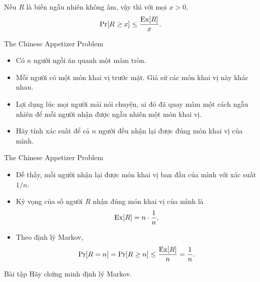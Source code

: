 \begin{frame}
  \begin{thrm}[Markov]
    Nếu $R$ là biến ngẫu nhiên \alert{không âm}, vậy thì với mọi $x > 0$,
    \[
      \mathrm{Pr}[R \geq x] \leq \frac{\mathrm{Ex}[R]}{x}.
    \] 
  \end{thrm}
\end{frame}

\begin{frame}{The Chinese Appetizer Problem}
  \begin{itemize}
  \item Có $n$ người ngồi ăn quanh một mâm tròn. 
  \item<+-> Mỗi người có một món khai vị trước mặt. Giả sử các món khai vị này khác nhau.
  \item Lợi dụng lúc mọi người mải nói chuyện, ai đó đã quay mâm một cách ngẫu nhiên để mỗi người nhận được ngẫu nhiên một món khai vị.
  \item Hãy tính xác suất để cả $n$ người đều nhận lại được đúng món khai vị của mình. 
  \end{itemize}
\end{frame}

\begin{frame}{The Chinese Appetizer Problem}
  \begin{itemize}
  \item<+->  Dễ thấy,  mỗi người nhận lại được món khai vị ban đầu của mình với xác suất $1/n$.
  \item<+->  Kỳ vọng của số người $R$ nhận đúng món khai vị của mình là 
    \[
      \mathrm{Ex}[R] = n\cdot \frac{1}{n}.
    \]  
    
  \item<+-> Theo định lý Markov,
    \[
      \mathrm{Pr}[R =n] = \mathrm{Pr}[R \geq n] \leq \frac{\mathrm{Ex}[R]}{n} = \frac{1}{n}.
    \] 
  \end{itemize}

\end{frame}

\begin{frame}{Bài tập}
  Hãy chứng minh định lý Markov.
\end{frame}

